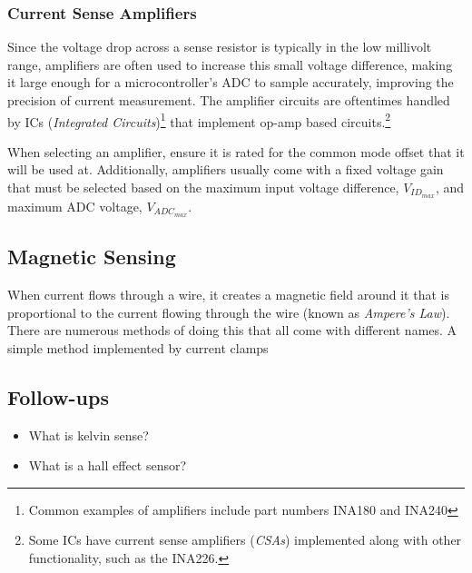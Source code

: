 \documentclass[main.tex]{subfiles}
\begin{document}
\subsubsection{Current Sense Amplifiers}
Since the voltage drop across a sense resistor is typically in the low millivolt range, amplifiers are often used to increase this small voltage difference, making it large enough for a microcontroller's ADC to sample accurately, improving the precision of current measurement. The amplifier circuits are oftentimes handled by ICs (\textit{Integrated Circuits})\footnote{Common examples of amplifiers include part numbers INA180 and INA240} that implement op-amp based circuits.\footnote{Some ICs have current sense amplifiers (\textit{CSAs}) implemented along with other functionality, such as the INA226.} 

\noindent When selecting an amplifier, ensure it is rated for the common mode offset that it will be used at. Additionally, amplifiers usually come with a fixed voltage gain that must be selected based on the maximum input voltage difference, $V_{ID_{max}}$, and maximum ADC voltage, $V_{ADC_{max}}$. 

\subsection{Magnetic Sensing}
When current flows through a wire, it creates a magnetic field around it that is proportional to the current flowing through the wire (known as \textit{Ampere's Law}). There are numerous methods of doing this that all come with different names. A simple method implemented by current clamps 

\subsection{Follow-ups}
\begin{itemize}
    \item What is kelvin sense?
    \item What is a hall effect sensor?
\end{itemize}
\end{document}

